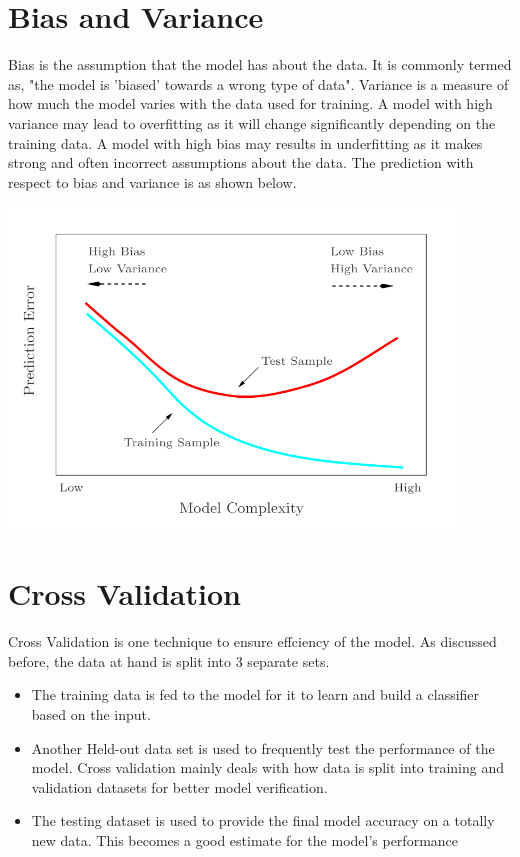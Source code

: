\section{Bias and Variance}
Bias is the assumption that the model has about the data. It is commonly termed as, "the model is 'biased' towards a wrong type of data".
Variance is a measure of how much the model varies with the data used for training. 
A model with high variance may lead to overfitting as it will change significantly depending on the training data.
A model with high bias may results in underfitting as it makes 
strong and often incorrect assumptions about the data. The prediction with respect to bias and variance is as shown below.

\includegraphics[width=0.9\textwidth]{figures/bias.PNG}

\section{Cross Validation}

Cross Validation is one technique to ensure effciency of the model. As discussed before, the data at hand is split into 3 separate sets. 

\begin{itemize}
  \item The training data is fed to the model for it to learn and build a classifier based on the input.
  \item Another Held-out data set is used to frequently test the performance of the model. Cross validation mainly deals with how data is split into training and validation datasets for better model verification.
  \item The testing dataset is used to provide the final model accuracy on a totally new data. This becomes a good estimate for the model's performance
\end{itemize}

